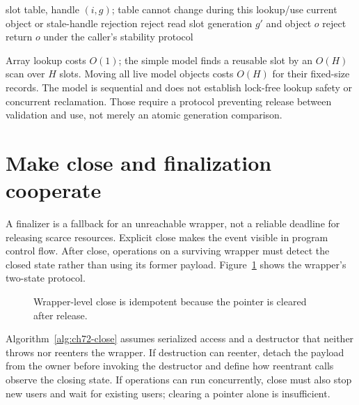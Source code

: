 \begin{algorithm}[htbp]
\caption{Resolve a sequential generation-tagged handle.}
\label{alg:ch72-handle}
\begin{pseudocode}
\Require slot table, handle $(i,g)$; table cannot change during this lookup/use
\Ensure current object or stale-handle rejection
 \State reject \EndIf
\State read slot generation $g'$ and object $o$
 \State reject \EndIf
\State return $o$ under the caller's stability protocol
\end{pseudocode}
\end{algorithm}

Array lookup costs $O(1)$; the simple model finds a reusable slot by an $O(H)$ scan over $H$ slots.
Moving all live model objects costs $O(H)$ for their fixed-size records.
The model is sequential and does not establish lock-free lookup safety or concurrent reclamation.
Those require a protocol preventing release between validation and use, not merely an atomic generation comparison.

\section{Make close and finalization cooperate}
\label{sec:ch72-close}
A finalizer is a fallback for an unreachable wrapper, not a reliable deadline for releasing scarce resources.
Explicit close makes the event visible in program control flow.
After close, operations on a surviving wrapper must detect the closed state rather than using its former payload.
Figure~\ref{fig:ch72-close} shows the wrapper's two-state protocol.

\begin{figure}[htbp]
\centering
{}
\caption{Wrapper-level close is idempotent because the pointer is cleared after release.}
\label{fig:ch72-close}
\end{figure}

Algorithm~\ref{alg:ch72-close} assumes serialized access and a destructor that neither throws nor reenters the wrapper.
If destruction can reenter, detach the payload from the owner before invoking the destructor and define how reentrant calls observe the closing state.
If operations can run concurrently, close must also stop new users and wait for existing users; clearing a pointer alone is insufficient.


